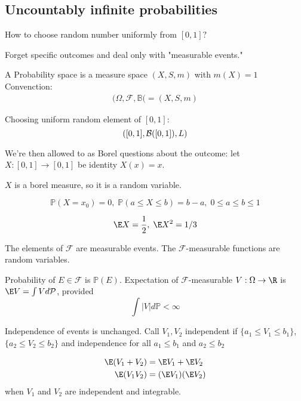 \subsection{Uncountably infinite probabilities}

How to choose random number uniformly from $[0,1]?$

\begin{definition}[Kolmogorov]
	Forget specific outcomes and deal only with "measurable events."
	
\end{definition}

\begin{definition}
	A Probability space is a measure space $(X,S, m)$ with $m(X)=1$
	Convenction:
	\begin{align*}
		(\Omega, \mathcal{F}, \mathbb{B}( = (X,S, m)
	\end{align*} 
\end{definition}

\begin{example}
	Choosing uniform random element of $[0,1]$:
	 \[
		 ([0,1], \mathcal{B}([0,1]), L)
	\] 
\end{example}

We're then allowed to as Borel questions about the outcome:
let
$X : [0,1] \to [0,1]$ be identity $X(x) = x$.

$X$ is a borel measure, so it is a random variable.

 \[
	\mathbb{P}(X = x_0) =0, \; \mathbb{P}(a \leq X \leq b) = b-a, \; 0 \leq a \leq b \leq 1
\]

\[
	\E X = \frac{1}{2}, \; \E X^2 = 1/3
\] 

The elements of $\mathcal{F}$ are measurable events. The $\mathcal{F}$-measurable functions are random variables.

Probability of $E \in \mathcal{F}$ is $\mathbb{P}(E)$. Expectation of $\mathcal{F}$-measurable $V : \Omega \to \R$ is $\E V = \int V d \mathcal{P}$, provided
\[
	\int |V| d \mathbb{P} < \infty
\] 

Independence of events is unchanged. Call $V_1, V_2$ independent if $\{ a_1 \leq V_1 \leq b_1 \}$,
$\{ a_2 \leq V_2 \leq b_2 \}$ and independence for all  $a_1 \leq b_1$ and $a_2 \leq b_2$


\begin{align*}
	\E ( V_1 + V_2 ) &= \E V_1 + \E V_2 \\
	\E (V_1 V_2 ) &= ( \E V_1 ) (\E V_2)
\end{align*} when $V_1$ and $V_2$ are independent and integrable.

